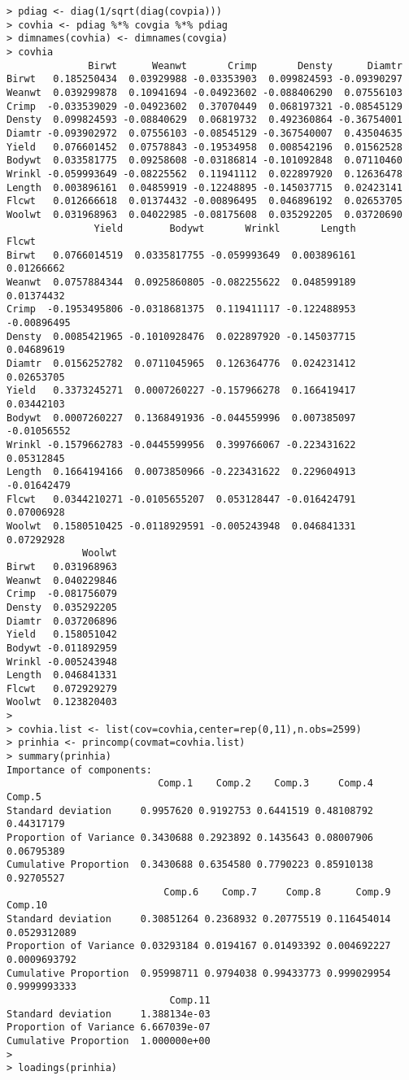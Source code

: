 \documentclass[titlepage]{article}  %
\begin{document}
\begin{verbatim}
> pdiag <- diag(1/sqrt(diag(covpia)))
> covhia <- pdiag %*% covgia %*% pdiag
> dimnames(covhia) <- dimnames(covgia)
> covhia
              Birwt      Weanwt       Crimp       Densty      Diamtr
Birwt   0.185250434  0.03929988 -0.03353903  0.099824593 -0.09390297
Weanwt  0.039299878  0.10941694 -0.04923602 -0.088406290  0.07556103
Crimp  -0.033539029 -0.04923602  0.37070449  0.068197321 -0.08545129
Densty  0.099824593 -0.08840629  0.06819732  0.492360864 -0.36754001
Diamtr -0.093902972  0.07556103 -0.08545129 -0.367540007  0.43504635
Yield   0.076601452  0.07578843 -0.19534958  0.008542196  0.01562528
Bodywt  0.033581775  0.09258608 -0.03186814 -0.101092848  0.07110460
Wrinkl -0.059993649 -0.08225562  0.11941112  0.022897920  0.12636478
Length  0.003896161  0.04859919 -0.12248895 -0.145037715  0.02423141
Flcwt   0.012666618  0.01374432 -0.00896495  0.046896192  0.02653705
Woolwt  0.031968963  0.04022985 -0.08175608  0.035292205  0.03720690
               Yield        Bodywt       Wrinkl       Length       Flcwt
Birwt   0.0766014519  0.0335817755 -0.059993649  0.003896161  0.01266662
Weanwt  0.0757884344  0.0925860805 -0.082255622  0.048599189  0.01374432
Crimp  -0.1953495806 -0.0318681375  0.119411117 -0.122488953 -0.00896495
Densty  0.0085421965 -0.1010928476  0.022897920 -0.145037715  0.04689619
Diamtr  0.0156252782  0.0711045965  0.126364776  0.024231412  0.02653705
Yield   0.3373245271  0.0007260227 -0.157966278  0.166419417  0.03442103
Bodywt  0.0007260227  0.1368491936 -0.044559996  0.007385097 -0.01056552
Wrinkl -0.1579662783 -0.0445599956  0.399766067 -0.223431622  0.05312845
Length  0.1664194166  0.0073850966 -0.223431622  0.229604913 -0.01642479
Flcwt   0.0344210271 -0.0105655207  0.053128447 -0.016424791  0.07006928
Woolwt  0.1580510425 -0.0118929591 -0.005243948  0.046841331  0.07292928
             Woolwt
Birwt   0.031968963
Weanwt  0.040229846
Crimp  -0.081756079
Densty  0.035292205
Diamtr  0.037206896
Yield   0.158051042
Bodywt -0.011892959
Wrinkl -0.005243948
Length  0.046841331
Flcwt   0.072929279
Woolwt  0.123820403
> 
> covhia.list <- list(cov=covhia,center=rep(0,11),n.obs=2599)
> prinhia <- princomp(covmat=covhia.list)
> summary(prinhia)
Importance of components:
                          Comp.1    Comp.2    Comp.3     Comp.4     Comp.5
Standard deviation     0.9957620 0.9192753 0.6441519 0.48108792 0.44317179
Proportion of Variance 0.3430688 0.2923892 0.1435643 0.08007906 0.06795389
Cumulative Proportion  0.3430688 0.6354580 0.7790223 0.85910138 0.92705527
                           Comp.6    Comp.7     Comp.8      Comp.9      Comp.10
Standard deviation     0.30851264 0.2368932 0.20775519 0.116454014 0.0529312089
Proportion of Variance 0.03293184 0.0194167 0.01493392 0.004692227 0.0009693792
Cumulative Proportion  0.95998711 0.9794038 0.99433773 0.999029954 0.9999993333
                            Comp.11
Standard deviation     1.388134e-03
Proportion of Variance 6.667039e-07
Cumulative Proportion  1.000000e+00
> 
> loadings(prinhia)


\end{verbatim}
\end{document}
